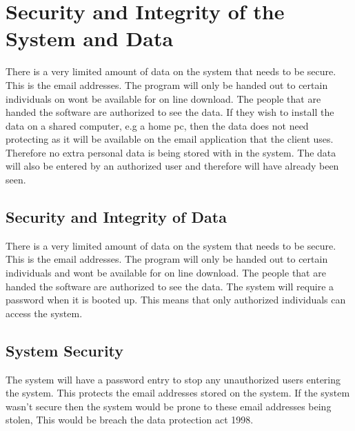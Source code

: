 \section{Security and Integrity of the System and Data}
There is a very limited amount of data on the system that needs to be secure. This is the email addresses. The program will only be handed out to certain individuals on wont be available for on line download. The people that are handed the software are authorized to see the data. If they wish to install the data on a shared computer, e.g a home pc, then the data does not need protecting as it will be available on the email application that the client uses. Therefore no extra personal data is being stored with in the system. The data will also be entered by an authorized user and therefore will have already been seen. 

\subsection{Security and Integrity of Data}
There is a very limited amount of data on the system that needs to be secure. This is the email addresses. The program will only be handed out to certain individuals and wont be available for on line download. The people that are handed the software are authorized to see the data. The system will require a password when it is booted up. This means that only authorized individuals can access the system.  

\subsection{System Security}
The system will have a password entry to stop any unauthorized users entering the system. This protects the email addresses stored on the system. If the system wasn't secure then the system would be prone to these email addresses being stolen, This would be breach the data protection act 1998. 

